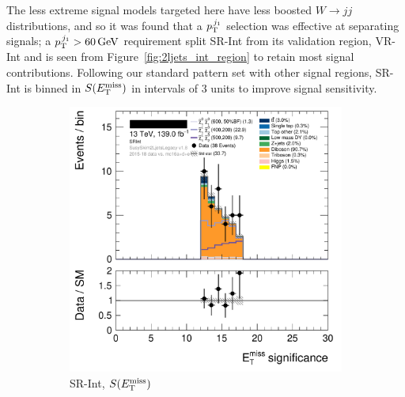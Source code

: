 The less extreme signal models targeted here have less boosted
$W\rightarrow jj$ distributions, and so it was found that a $\ptjone$ selection
was effective at separating signals;
a $\ptjone > 60\,\eV[G]$ requirement split SR-Int from its validation region,
VR-Int and is seen from Figure~\ref{fig:2ljets_int_region} to retain most
signal contributions.
Following our standard pattern set with other signal regions, SR-Int is binned
in $\metsig$ in intervals of $3$ units to improve signal sensitivity.

\begin{figure}[tp]
\centering
\begin{subfigure}{0.48\textwidth}
\centering
\includegraphics[width=\textwidth]{figures/2ljets_def_met_Sign_SRInt.png}
\caption{SR-Int, $\metsig$}
\end{subfigure}
\hfill
\begin{subfigure}{0.48\textwidth}
\centering

\end{subfigure}
\end{figure}
